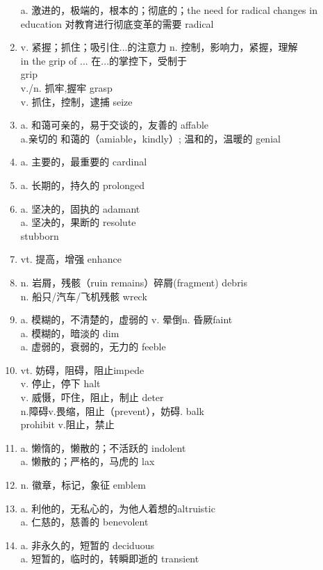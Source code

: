 \documentclass[UTF8]{ctexart}
\begin{document}
\begin{enumerate}
a. 激进的，极端的，根本的；彻底的；the need for radical changes in education 对教育进行彻底变革的需要  \qquad radical    
\item v. 紧握；抓住；吸引住...的注意力 n. 控制，影响力，紧握，理解  \\in the grip of ... 在...的掌控下，受制于\\ \qquad grip\\ v./n. 抓牢,握牢 \qquad grasp \\ v. 抓住，控制，逮捕 \qquad seize
\item a. 和蔼可亲的，易于交谈的，友善的  \qquad affable \\ a.亲切的 和蔼的（amiable，kindly）; 温和的，温暖的 \qquad genial
\item a. 主要的，最重要的 \qquad cardinal 
\item a. 长期的，持久的 \qquad prolonged
\item a. 坚决的，固执的 \qquad adamant \\ a. 坚决的，果断的 \qquad resolute \\ stubborn
\item vt. 提高，增强 \qquad enhance 
\item n. 岩屑，残骸（ruin remains）碎屑(fragment) \qquad debris \\ n. 船只/汽车/飞机残骸 \qquad wreck 
\item a. 模糊的，不清楚的，虚弱的 \quad v. 晕倒\quad n. 昏厥\qquad faint \\ a. 模糊的，暗淡的 \qquad dim\\a. 虚弱的，衰弱的，无力的 \qquad feeble 
\item vt. 妨碍，阻碍，阻止\qquad impede\\ v. 停止，停下 \qquad halt\\ v. 威慑，吓住，阻止，制止 \qquad deter\\ n.障碍v.畏缩，阻止（prevent），妨碍. \qquad balk \\prohibit v.阻止，禁止
\item a. 懒惰的，懒散的；不活跃的 \qquad  indolent \\ a. 懒散的；严格的，马虎的 \qquad lax
\item n. 徽章，标记，象征 \qquad emblem 
\item a. 利他的，无私心的，为他人着想的\qquad altruistic \\ a. 仁慈的，慈善的 \qquad benevolent
\item a. 非永久的，短暂的 \qquad deciduous \\ a. 短暂的，临时的，转瞬即逝的 \qquad transient

\end{enumerate}
\end{document}
